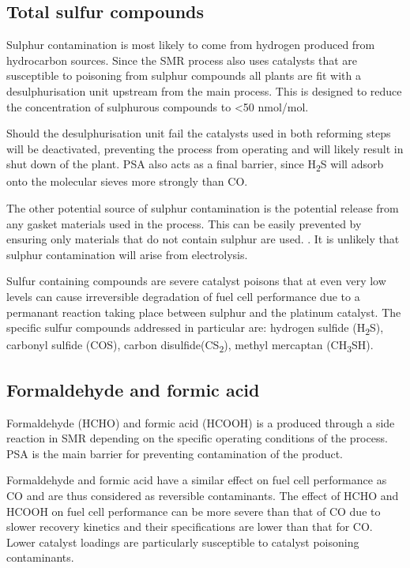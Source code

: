 \subsection*{Total sulfur compounds}
Sulphur contamination is most likely to come from hydrogen produced from hydrocarbon sources. 
Since the SMR process also uses catalysts that are susceptible to poisoning from sulphur compounds all plants are fit with a desulphurisation unit upstream from the main process. \cite{Muradov2015} This is designed to reduce the concentration of sulphurous compounds to <50 nmol/mol. \cite{Bacquart2018}

Should the desulphurisation unit fail the catalysts used in both reforming steps will be deactivated, preventing the process from operating and will likely result in shut down of the plant. PSA also acts as a final barrier, since H\textsubscript{2}S will adsorb onto the molecular sieves more strongly than CO. \cite{Bacquart2018}

The other potential source of sulphur contamination is the potential release from any gasket materials used in the process. This can be easily prevented by ensuring only materials that do not contain sulphur are used. \cite{InternationalStandardISO14687-2:20122012}. It is unlikely that sulphur contamination will arise from electrolysis. 

Sulfur containing compounds are severe catalyst poisons that at even very low levels can cause irreversible degradation of fuel cell performance due to a permanant reaction taking place between sulphur and the platinum catalyst. The specific sulfur compounds addressed in particular are: hydrogen sulfide (H\textsubscript{2}S), carbonyl sulfide (COS), carbon disulfide(CS\textsubscript{2}), methyl mercaptan (CH\textsubscript{3}SH). \cite{InternationalStandardISO14687-2:20122012} 

\subsection*{Formaldehyde and formic acid}
Formaldehyde (HCHO) and formic acid (HCOOH) is a produced through a side reaction in SMR depending on the specific operating conditions of the process.\cite{Muradov2015} PSA is the main barrier for preventing contamination of the product. \cite{Bacquart2018}

Formaldehyde and formic acid have a similar effect on fuel cell performance as CO and are thus considered as reversible contaminants. The effect of HCHO and HCOOH on fuel cell performance can be more severe than that of CO due to slower recovery kinetics and their specifications are lower than that for CO. \cite{InternationalStandardISO14687-2:20122012} Lower catalyst loadings are particularly susceptible to catalyst poisoning contaminants.


